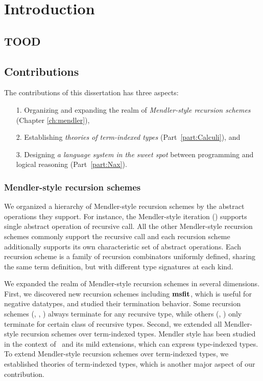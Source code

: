 \chapter{Introduction}\label{ch:intro}

\section{TOOD}\label{sec:intro:TODO}

\section{Contributions}\label{sec:intro:contrib}
The contributions of this dissertation has three aspects:
\begin{itemize}
\item[1.]
Organizing and expanding the realm of \emph{Mendler-style recursion schemes}
(Chapter \ref{ch:mendler}), %

\item[2.] Establishing \emph{theories of term-indexed types}
	(Part~\ref{part:Calculi}), and

\item[3.] Designing \emph{a language system in the sweet spot}
	between programming and logical reasoning (Part~\ref{part:Nax}).
\end{itemize}

\subsection{Mendler-style recursion schemes}
We organized a hierarchy of Mendler-style recursion schemes
by the abstract operations they support. For instance,
the Mendler-style iteration (\MIt) supports single abstract operation
of recursive call. All the other Mendler-style recursion schemes commonly
support the recursive call and each recursion scheme additionally supports its
own characteristic set of abstract operations. Each recursion scheme is a
family of recursion combinators uniformly defined, sharing the same
term definition, but with different type signatures at each kind.

We expanded the realm of Mendler-style recursion schemes in several dimensions.
First, we discovered new recursion schemes including $\mathbf{msfit}$, which is useful
for negative datatypes, and studied their termination behavior. Some recursion
schemes (\eg, \MIt, \MsfIt) always terminate for any recursive type, while
others (\eg, \McvPr) only terminate for certain class of recursive types.
Second, we extended all Mendler-style recursion schemes over term-indexed types.
Mendler style has been studied in the context of \Fw\ and its mild extensions,
which can express type-indexed types. To extend Mendler-style recursion schemes
over term-indexed types, we established theories of term-indexed types, which is
another major aspect of our contribution.

